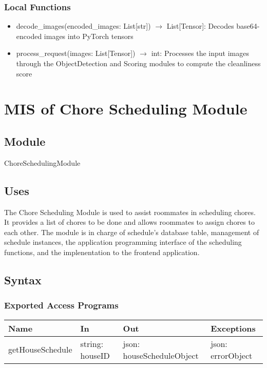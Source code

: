 \documentclass[12pt, titlepage]{article}
\begin{document}
\subsubsection{Local Functions}

\begin{itemize}
  \item decode{\_}images(encoded{\_}images: List[str]) $\rightarrow$ List[Tensor]: Decodes base64-encoded images into PyTorch tensors
  \item process{\_}request(images: List[Tensor]) $\rightarrow$ int: Processes the input images through the ObjectDetection and Scoring modules to compute the cleanliness score
\end{itemize}

\newpage


\section{MIS of Chore Scheduling Module} \label{Module} 

\subsection{Module}

ChoreSchedulingModule

\subsection{Uses}
The Chore Scheduling Module is used to assist roommates in scheduling chores. It provides a list of chores to be done and allows roommates to assign chores to each other. The module is in charge of schedule's database table, management of schedule instances, the application programming interface of the scheduling functions, and the implenentation to the frontend application. 

\subsection{Syntax}

\subsubsection{Exported Access Programs}

\begin{center}
\begin{tabular}{p{4cm} p{3cm} p{5cm} p{3.5cm}}
\hline
\textbf{Name} & \textbf{In} & \textbf{Out} & \textbf{Exceptions} \\
\hline
getHouseSchedule & string: houseID & json: houseScheduleObject & json: errorObject \\
\hline
\end{tabular}
\end{center}
\end{document}
